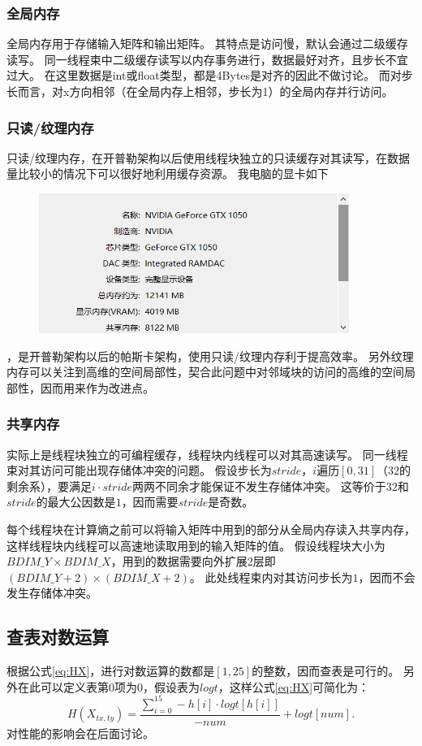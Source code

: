 \documentclass[UTF8, a4paper, 11pt]{article}
\begin{document}
\subsubsection{全局内存}
全局内存用于存储输入矩阵和输出矩阵。
其特点是访问慢，默认会通过二级缓存读写。
同一线程束中二级缓存读写以内存事务进行，数据最好对齐，且步长不宜过大。
在这里数据是int或float类型，都是4Bytes是对齐的因此不做讨论。
而对步长而言，对x方向相邻（在全局内存上相邻，步长为1）的全局内存并行访问。
\subsubsection{只读/纹理内存}
只读/纹理内存，在开普勒架构以后使用线程块独立的只读缓存对其读写，在数据量比较小的情况下可以很好地利用缓存资源。
我电脑的显卡如下
\begin{figure}[H]
    \centering
    \includegraphics[width=0.9\textwidth]{显卡1.png}
\end{figure}
，是开普勒架构以后的帕斯卡架构，使用只读/纹理内存利于提高效率。
另外纹理内存可以关注到高维的空间局部性，契合此问题中对邻域块的访问的高维的空间局部性，因而用来作为改进点。
\subsubsection{共享内存}
实际上是线程块独立的可编程缓存，线程块内线程可以对其高速读写。
同一线程束对其访问可能出现存储体冲突的问题。
假设步长为$stride$，$i$遍历$[0,31]$（$32$的剩余系），要满足$i\cdot stride$两两不同余才能保证不发生存储体冲突。
这等价于$32$和$stride$的最大公因数是$1$，因而需要$stride$是奇数。

每个线程块在计算熵之前可以将输入矩阵中用到的部分从全局内存读入共享内存，这样线程块内线程可以高速地读取用到的输入矩阵的值。
假设线程块大小为$BDIM\_Y\times BDIM\_X$，用到的数据需要向外扩展2层即$(BDIM\_Y+2)\times(BDIM\_X+2)$。
此处线程束内对其访问步长为$1$，因而不会发生存储体冲突。
\subsection{查表对数运算}
根据公式\ref{eq:HX}，进行对数运算的数都是$[1,25]$的整数，因而查表是可行的。
另外在此可以定义表第$0$项为$0$，假设表为$logt$，这样公式\ref{eq:HX}可简化为：
\begin{equation}
    H(X_{tx,ty})=\frac{\sum_{i=0}^{15}-h[i]\cdot logt[h[i]]}{-num}+logt[num].
\end{equation}
对性能的影响会在后面讨论。
\end{document}
